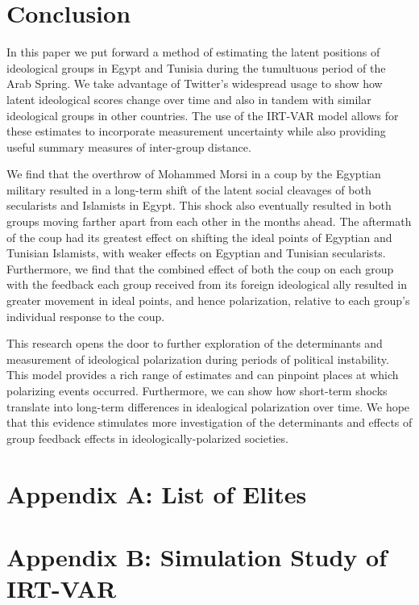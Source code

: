 \documentclass[12pt]{article}
\begin{document}
\section*{Conclusion}

In this paper we put forward a method of estimating the latent positions of ideological groups in Egypt and Tunisia during the tumultuous period of the Arab Spring. We take advantage of Twitter's widespread usage to show how latent ideological scores change over time and also in tandem with similar ideological groups in other countries. The use of the IRT-VAR model allows for these estimates to incorporate measurement uncertainty while also providing useful summary measures of inter-group distance.

We find that the overthrow of Mohammed Morsi in a coup by the Egyptian military resulted in a long-term shift of the latent social cleavages of both secularists and Islamists in Egypt. This shock also eventually resulted in both groups moving farther apart from each other in the months ahead. The aftermath of the coup had its greatest effect on shifting the ideal points of Egyptian and Tunisian Islamists, with weaker effects on Egyptian and Tunisian secularists. Furthermore, we find that the combined effect of both the coup on each group with the feedback each group received from its foreign ideological ally resulted in greater movement in ideal points, and hence polarization, relative to each group's individual response to the coup. 

This research opens the door to further exploration of the determinants and measurement of ideological polarization during periods of political instability. This model provides a rich range of estimates and can pinpoint places at which polarizing events occurred. Furthermore, we can show how short-term shocks translate into long-term differences in idealogical polarization over time. We hope that this evidence stimulates more investigation of the determinants and effects of group feedback effects in ideologically-polarized societies.

\section*{Appendix A: List of Elites}



\section*{Appendix B: Simulation Study of IRT-VAR}
\end{document}
